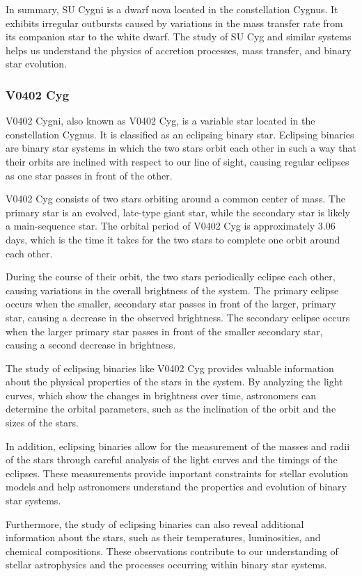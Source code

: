 In summary, SU Cygni is a dwarf nova located in the constellation Cygnus. It exhibits irregular outbursts caused by variations in the mass transfer rate from its companion star to the white dwarf. The study of SU Cyg and similar systems helps us understand the physics of accretion processes, mass transfer, and binary star evolution.

\subsubsection*{ V0402 Cyg }
V0402 Cygni, also known as V0402 Cyg, is a variable star located in the constellation Cygnus. It is classified as an eclipsing binary star. Eclipsing binaries are binary star systems in which the two stars orbit each other in such a way that their orbits are inclined with respect to our line of sight, causing regular eclipses as one star passes in front of the other.

V0402 Cyg consists of two stars orbiting around a common center of mass. The primary star is an evolved, late-type giant star, while the secondary star is likely a main-sequence star. The orbital period of V0402 Cyg is approximately 3.06 days, which is the time it takes for the two stars to complete one orbit around each other.

During the course of their orbit, the two stars periodically eclipse each other, causing variations in the overall brightness of the system. The primary eclipse occurs when the smaller, secondary star passes in front of the larger, primary star, causing a decrease in the observed brightness. The secondary eclipse occurs when the larger primary star passes in front of the smaller secondary star, causing a second decrease in brightness.

The study of eclipsing binaries like V0402 Cyg provides valuable information about the physical properties of the stars in the system. By analyzing the light curves, which show the changes in brightness over time, astronomers can determine the orbital parameters, such as the inclination of the orbit and the sizes of the stars.

In addition, eclipsing binaries allow for the measurement of the masses and radii of the stars through careful analysis of the light curves and the timings of the eclipses. These measurements provide important constraints for stellar evolution models and help astronomers understand the properties and evolution of binary star systems.

Furthermore, the study of eclipsing binaries can also reveal additional information about the stars, such as their temperatures, luminosities, and chemical compositions. These observations contribute to our understanding of stellar astrophysics and the processes occurring within binary star systems.

